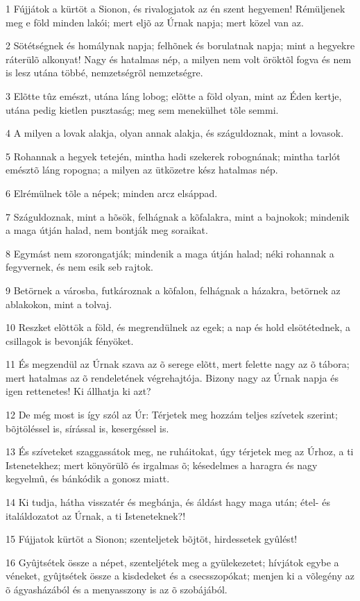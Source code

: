 \par 1 Fújjátok a kürtöt a Sionon, és rivalogjatok az én szent hegyemen! Rémüljenek meg e föld minden lakói; mert eljõ az Úrnak napja; mert közel van az.
\par 2 Sötétségnek és homálynak napja; felhõnek és borulatnak napja; mint a hegyekre ráterülõ alkonyat! Nagy és hatalmas nép, a milyen nem volt öröktõl fogva és nem is lesz utána többé, nemzetségrõl nemzetségre.
\par 3 Elõtte tûz emészt, utána láng lobog; elõtte a föld olyan, mint az Éden kertje, utána pedig kietlen pusztaság; meg sem menekülhet tõle semmi.
\par 4 A milyen a lovak alakja, olyan annak alakja, és száguldoznak, mint a lovasok.
\par 5 Rohannak a hegyek tetején, mintha hadi szekerek robognának; mintha tarlót emésztõ láng ropogna; a milyen az ütközetre kész hatalmas nép.
\par 6 Elrémülnek tõle a népek; minden arcz elsáppad.
\par 7 Száguldoznak, mint a hõsök, felhágnak a kõfalakra, mint a bajnokok; mindenik a maga útján halad, nem bontják meg soraikat.
\par 8 Egymást nem szorongatják; mindenik a maga útján halad; néki rohannak a fegyvernek, és nem esik seb rajtok.
\par 9 Betörnek a városba, futkároznak a kõfalon, felhágnak a házakra, betörnek az ablakokon, mint a tolvaj.
\par 10 Reszket elõttök a föld, és megrendülnek az egek; a nap és hold elsötétednek, a csillagok is bevonják fényöket.
\par 11 És megzendül az Úrnak szava az õ serege elõtt, mert felette nagy az õ tábora; mert hatalmas az õ rendeletének végrehajtója. Bizony nagy az Úrnak napja és igen rettenetes! Ki állhatja ki azt?
\par 12 De még most is így szól az Úr: Térjetek meg hozzám teljes szívetek szerint; bõjtöléssel is, sírással is, kesergéssel is.
\par 13 És szíveteket szaggassátok meg, ne ruháitokat, úgy térjetek meg az Úrhoz, a ti Istenetekhez; mert könyörülõ és irgalmas õ; késedelmes a haragra és nagy kegyelmû, és bánkódik a gonosz miatt.
\par 14 Ki tudja, hátha visszatér és megbánja, és áldást hagy maga után; étel- és italáldozatot az Úrnak, a ti Isteneteknek?!
\par 15 Fújjatok kürtöt a Sionon; szenteljetek bõjtöt, hirdessetek gyûlést!
\par 16 Gyûjtsétek össze a népet, szenteljétek meg a gyülekezetet; hívjátok egybe a véneket, gyûjtsétek össze a kisdedeket és a csecsszopókat; menjen ki a võlegény az õ ágyasházából és a menyasszony is az õ szobájából.
